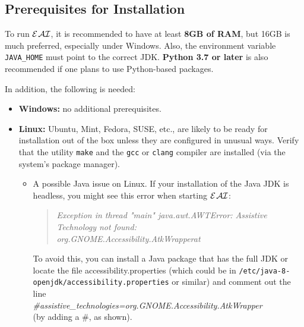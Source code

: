 \documentclass[11pt]{article}
\newcommand{\ERGOAI}{\mbox{{\ensuremath{\cal{E}}\smaller{{\sc{RGO}}}}\ensuremath{\cal{AI}}}\xspace}
\begin{document}
\subsection{Prerequisites for Installation}\label{sec-inst-prereq}

To run \ERGOAI, it is recommended to have at least \textbf{8GB of RAM}, but
16GB is much preferred, especially under Windows.
Also,
the environment variable \texttt{JAVA\_HOME} must point to the correct JDK.
\textbf{Python 3.7 or later} is also
recommended if one plans to use Python-based packages.

\noindent
In addition, the following is needed:
\begin{itemize}
\item[] \textbf{Windows:}  no additional prerequisites.
\item[] \textbf{Linux:} Ubuntu, Mint, Fedora, SUSE, etc., are likely to be
  ready for installation out of the box unless they are configured in
  unusual ways.  Verify that the utility \texttt{make}  and the
  \texttt{gcc} or \texttt{clang}    compiler are
  installed (via the system's package manager).

  \begin{itemize}
  \item A possible Java issue on Linux.  If your installation of the Java JDK
    is headless, you might see this error when starting \ERGOAI:
    
    \begin{quote}
      \it
      Exception in thread "main" java.awt.AWTError: Assistive Technology not found:\\
      org.GNOME.Accessibility.AtkWrapperat
    \end{quote}
    
    To avoid this, you can install a Java package that has the full JDK or
    locate the file accessibility.properties (which could be in
    \texttt{/etc/java-8-openjdk/accessibility.properties} or similar) and comment
    out the line
    \\
    \hspace*{8mm}
    \emph{\#assistive\_technologies=org.GNOME.Accessibility.AtkWrapper}
    \\
    (by adding a \#, as shown).
    

\end{itemize}
\end{itemize}
\end{document}
